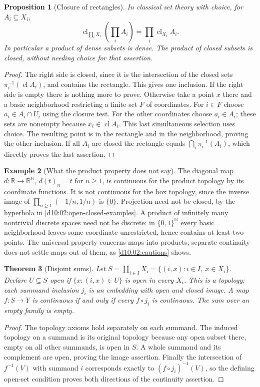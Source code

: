 \documentclass[11pt,oneside,openany]{book}
\newtheorem{theorem}{Theorem}[chapter]
\newtheorem{proposition}[theorem]{Proposition}
\theoremstyle{definition}
\newtheorem{example}[theorem]{Example}
\theoremstyle{remark}
\newcommand{\R}{\mathbb R}\newcommand{\C}{\mathbb C}
\newcommand{\N}{\mathbb N}\newcommand{\Z}{\mathbb Z}\newcommand{\Q}{\mathbb Q}
\DeclareMathOperator{\cl}{cl}
\begin{document}
\begin{proposition}[Closure of rectangles]\label{d10:03:product-closure}
In classical set theory with choice, for $A_i\subseteq X_i$,
\[
 \cl_{\prod_iX_i}\!\left(\prod_i A_i\right)=\prod_i\cl_{X_i}A_i.
\]
In particular a product of dense subsets is dense. The product of closed subsets is closed, without needing choice for that assertion.
\end{proposition}
\begin{proof}
The right side is closed, since it is the intersection of the closed sets $\pi_i^{-1}(\cl A_i)$, and contains the rectangle. This gives one inclusion. If the right side is empty there is nothing more to prove. Otherwise take a point $x$ there and a basic neighborhood restricting a finite set $F$ of coordinates. For $i\in F$ choose $a_i\in A_i\cap U_i$ using the closure test. For the other coordinates choose $a_i\in A_i$; these sets are nonempty because $x_i\in\cl A_i$. This last simultaneous selection uses choice. The resulting point is in the rectangle and in the neighborhood, proving the other inclusion. If all $A_i$ are closed the rectangle equals $\bigcap_i\pi_i^{-1}(A_i)$, which directly proves the last assertion.
\end{proof}

\begin{example}[What the product property does not say]\label{d10:03:product-cautions}
The diagonal map $d:\R\to\R^{\N}$, $d(t)_n=t$ for $n\ge1$, is continuous for the product topology by its coordinate functions. It is not continuous for the box topology, since the inverse image of $\prod_{n\ge1}(-1/n,1/n)$ is $\{0\}$. Projection need not be closed, by the hyperbola in \cref{d10:02:open-closed-examples}. A product of infinitely many nontrivial discrete spaces need not be discrete: in $\{0,1\}^{\N}$ every basic neighborhood leaves some coordinate unrestricted, hence contains at least two points. The universal property concerns maps into products; separate continuity does not settle maps out of them, as \cref{d10:02:cautions} shows.
\end{example}

\begin{theorem}[Disjoint sums]\label{d10:03:sum}
Let $S=\coprod_{i\in I}X_i=\{(i,x):i\in I,\ x\in X_i\}$. Declare $U\subseteq S$ open if $\{x:(i,x)\in U\}$ is open in every $X_i$. This is a topology; each summand inclusion $j_i$ is an embedding with open and closed image. A map $f:S\to Y$ is continuous if and only if every $f\circ j_i$ is continuous. The sum over an empty family is empty.
\end{theorem}
\begin{proof}
The topology axioms hold separately on each summand. The induced topology on a summand is its original topology because any open subset there, empty on all other summands, is open in $S$. A whole summand and its complement are open, proving the image assertion. Finally the intersection of $f^{-1}(V)$ with summand $i$ corresponds exactly to $(f\circ j_i)^{-1}(V)$, so the defining open-set condition proves both directions of the continuity assertion.
\end{proof}
\end{document}
